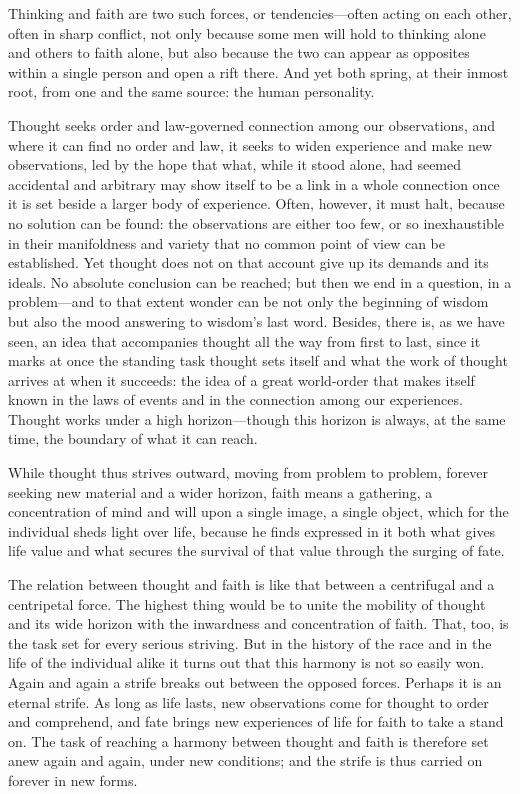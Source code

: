 \documentclass[12pt,a4paper]{article}
\newcommand{\opage}[1]{\marginnote{\footnotesize\textit{[#1]}}}
\begin{document}
Thinking and faith are two such forces, or tendencies---often acting on each other,
often in sharp conflict, not only because some men will hold to thinking alone and
others to faith alone, but also because the two can appear as opposites within a
single person and open a rift there. And yet both spring, at their inmost root, from
one and the same source: the human personality.

Thought seeks order and law-governed connection among our observations, and where it
can find no order and law, it seeks to widen experience and make new observations,
led by the hope that what, while it stood alone, had seemed accidental and arbitrary
may show itself to be a link in a whole connection once it is set beside a larger
body of experience. Often, however, it must halt, because no solution can be found:
the observations are either too few, or so inexhaustible in their manifoldness and
variety that no common point of view can be established. Yet thought does not on that
account give up its demands and its ideals. No absolute conclusion can be reached;
but then we end in a question, in a problem---and to that extent wonder can be not
only the beginning of wisdom but also the mood answering to wisdom's last word.
Besides, there is, as we have seen, an idea that accompanies thought all the way from
first to last, since it marks at once the standing task thought sets itself and what
the work of thought arrives at when it succeeds: the idea of a great world-order that
makes itself known in the laws of events and in the connection among our experiences.
Thought works under a high horizon---though this horizon is always, at the same time,
the boundary of what it can reach.

While thought thus strives outward, moving from \opage{37}problem to problem, forever seeking
new material and a wider horizon, faith means a gathering, a concentration of mind
and will upon a single image, a single object, which for the individual sheds light
over life, because he finds expressed in it both what gives life value and what
secures the survival of that value through the surging of fate.

The relation between thought and faith is like that between a centrifugal and a
centripetal force. The highest thing would be to unite the mobility of thought and
its wide horizon with the inwardness and concentration of faith. That, too, is the
task set for every serious striving. But in the history of the race and in the life
of the individual alike it turns out that this harmony is not so easily won. Again
and again a strife breaks out between the opposed forces. Perhaps it is an eternal
strife. As long as life lasts, new observations come for thought to order and
comprehend, and fate brings new experiences of life for faith to take a stand on.
The task of reaching a harmony between thought and faith is therefore set anew again
and again, under new conditions; and the strife is thus carried on forever in new
forms.
\end{document}
